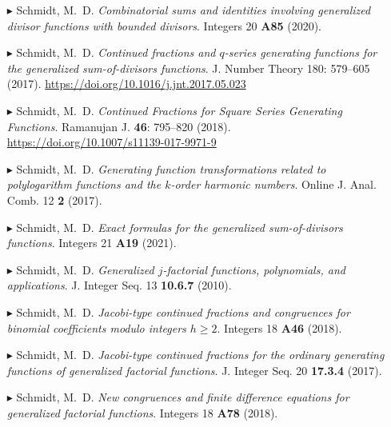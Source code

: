 \documentclass[10pt,letterpaper,sans]{moderncv}        %
\begin{document}
\begin{itemize}
\item[$\blacktriangleright$]
Schmidt, M.~D. \emph{Combinatorial sums and identities involving generalized divisor functions with bounded divisors}. 
Integers 20 {\bfseries A85} (2020). 

\item[$\blacktriangleright$]
Schmidt, M.~D. \emph{Continued fractions and $q$-series generating functions for the 
                     generalized sum-of-divisors functions}. 
J. Number Theory 180: 579--605 (2017). 
\url{https://doi.org/10.1016/j.jnt.2017.05.023}

\item[$\blacktriangleright$]
Schmidt, M.~D. \emph{Continued Fractions for Square Series Generating Functions}. 
Ramanujan J. {\bfseries 46}: 795--820 (2018). 
\url{https://doi.org/10.1007/s11139-017-9971-9}

\item[$\blacktriangleright$]
Schmidt, M.~D. \emph{Generating function transformations related to 
                     polylogarithm functions and the $k$-order harmonic numbers}. 
Online J. Anal. Comb. 12 {\bfseries 2} (2017). 

\item[$\blacktriangleright$]
Schmidt, M.~D. \emph{Exact formulas for the generalized sum-of-divisors functions}. 
Integers 21 {\bfseries A19} (2021). 

\item[$\blacktriangleright$]
Schmidt, M.~D. \emph{Generalized $j$-factorial functions, polynomials, and applications}. 
J. Integer Seq. 13 {\bfseries 10.6.7}  (2010). 

\item[$\blacktriangleright$]
Schmidt, M.~D. \emph{Jacobi-type continued fractions and congruences for 
                     binomial coefficients modulo integers $h \geq 2$}. 
Integers 18 {\bfseries A46} (2018). 

\item[$\blacktriangleright$]
Schmidt, M.~D. \emph{Jacobi-type continued fractions for the ordinary generating functions of 
                     generalized factorial functions}. 
J. Integer Seq. 20 {\bfseries 17.3.4} (2017). 

\item[$\blacktriangleright$]
Schmidt, M.~D. \emph{New congruences and finite difference equations for generalized factorial functions}. 
Integers 18 {\bfseries A78} (2018). 


\end{itemize}
\end{document}
